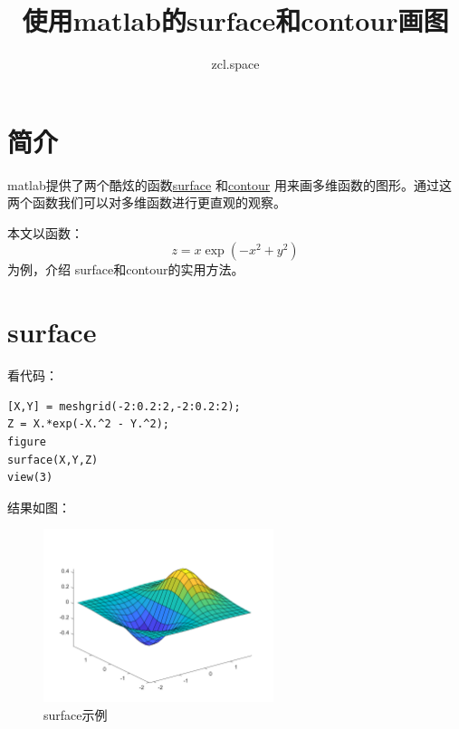 \documentclass[10pt,a4paper,UTF8]{article}
\author{zcl.space}
\date{}
\title{使用matlab的surface和contour画图}
\begin{document}
\maketitle
\tableofcontents
{}

\section{简介}
\label{sec:org2200315}


matlab提供了两个酷炫的函数\href{https://www.mathworks.com/help/matlab/ref/surface.html?searchHighlight=surface\&s\_tid=doc\_srchtitle}{surface} 和\href{https://www.mathworks.com/help/matlab/ref/contour.html?searchHighlight=contour\&s\_tid=doc\_srchtitle}{contour} 用来画多维函数的图形。通过这两个函数我们可以对多维函数进行更直观的观察。

本文以函数：
\begin{equation}
\label{eq:1}
z = x\exp(-x^{2} + y^{2})
\end{equation}
为例，介绍 surface和contour的实用方法。

\section{surface}
\label{sec:org1dc47c9}


看代码：
\lstset{language=matlab,label= ,caption= ,captionpos=b,firstnumber=1,numbers=left}
\begin{lstlisting}
[X,Y] = meshgrid(-2:0.2:2,-2:0.2:2);
Z = X.*exp(-X.^2 - Y.^2);
figure
surface(X,Y,Z)
view(3)
\end{lstlisting}

结果如图：
\begin{figure}[htbp]
\centering
\includegraphics[width=0.6\textwidth]{../../img/communication_matlab/20170708surface.png}
\caption{\label{fig:org2498ddf}
surface示例}
\end{figure}
\end{document}

